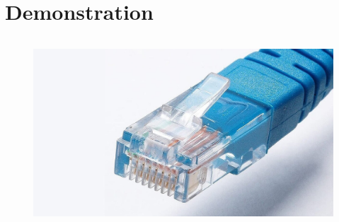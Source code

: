 \documentclass[
    ngerman,
    accentcolor=3b,
    fontsize= 12pt,
    a4paper,
    aspectratio=169,
    colorback=true,
    fancy_row_colors,
    leqno,
    fleqn,
    boxarc=3pt,
    fleqn,
    main,
    design=2008,
]{algoslides}
\begin{document}
    \section{Demonstration}\label{2}\label{Demonstration}
    \begin{frame}[<+(1)->]
        \slidehead{}
    \end{frame}

    \begin{frame}
        \slidehead{}
        \vspace{-1em}
        \begin{columns}[c]
            \begin{column}{.5\textwidth}
                \begin{figure}[ht!]
                    \centering
                    \includegraphics[height=.3\textheight]{rj45-plug}
                    \label{fig:rj45-plug}


\end{figure}
\end{column}
\end{columns}
\end{frame}
\end{document}

